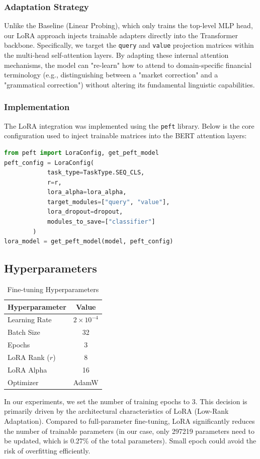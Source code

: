 \documentclass[a4paper, 12pt, twoside]{article}
\begin{document}
\subsubsection{Adaptation Strategy}
Unlike the Baseline (Linear Probing), which only trains the top-level MLP head, our LoRA approach injects trainable adapters directly into the Transformer backbone. Specifically, we target the \texttt{query} and \texttt{value} projection matrices within the multi-head self-attention layers. By adapting these internal attention mechanisms, the model can "re-learn" how to attend to domain-specific financial terminology (e.g., distinguishing between a "market correction" and a "grammatical correction") without altering its fundamental linguistic capabilities.
\subsubsection{Implementation}
The LoRA integration was implemented using the \texttt{peft} library. Below is the core configuration used to inject trainable matrices into the BERT attention layers:
\begin{lstlisting}[language=Python, caption=LoRA Configuration Snippet, basicstyle=\footnotesize\ttfamily, breaklines=true, frame=single]
from peft import LoraConfig, get_peft_model
peft_config = LoraConfig(
            task_type=TaskType.SEQ_CLS, 
            r=r, 
            lora_alpha=lora_alpha, 
            target_modules=["query", "value"],
            lora_dropout=dropout,
            modules_to_save=["classifier"] 
        )
lora_model = get_peft_model(model, peft_config)
\end{lstlisting}
\subsection{Hyperparameters}
\begin{table}[h]
\centering
\begin{tabular}{lc}
\toprule
Hyperparameter & Value \\
\midrule
Learning Rate & $2 \times 10^{-4}$ \\
Batch Size & 32 \\
Epochs & 3 \\
LoRA Rank ($r$) & 8 \\
LoRA Alpha & 16 \\
Optimizer & AdamW \\
\bottomrule
\end{tabular}
\caption{Fine-tuning Hyperparameters}
\end{table}
In our experiments, we set the number of training epochs to 3. This decision is primarily driven by the architectural characteristics of LoRA (Low-Rank Adaptation). Compared to full-parameter fine-tuning, LoRA significantly reduces the number of trainable parameters (in our case, only 297219 parameters need to be updated, which is 0.27\% of the total parameters). Small epoch could avoid the risk of overfitting efficiently.
\end{document}

